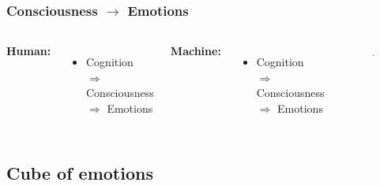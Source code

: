 \documentclass[12pt, aspectratio=169]{beamer}
\begin{document}
\begin{frame}
\frametitle{Consciousness $\rightarrow$ Emotions}
\begin{columns}[c] %

\textbf{Human:}
\begin{itemize}
\item Cognition $\Rightarrow$ Consciousness $\Rightarrow$ Emotions
\end{itemize}

\textbf{Machine:}
\begin{itemize}
\item Cognition $\Rightarrow$ Consciousness $\Rightarrow$ Emotions
\end{itemize}

\begin{figure}
\includegraphics[width=0.8\linewidth]{Kismet_312}
\end{figure}
\end{columns}
\end{frame}

\subsection{Cube of emotions}
\end{document}
